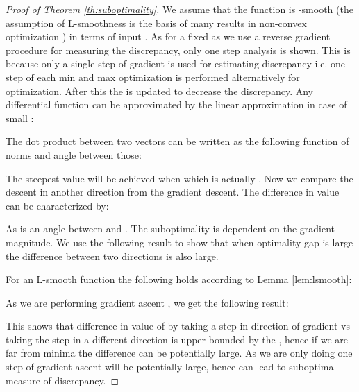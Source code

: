\documentclass[table,dvipsnames]{article}
\theoremstyle{plain}
\theoremstyle{definition}
\theoremstyle{remark}
\begin{document}
\begin{proof}[Proof of Theorem \ref{th:suboptimality}]
We assume that the function is -smooth (the assumption of L-smoothness is the basis of many results in non-convex optimization \citep{carmon2020lower}) in terms of input . As for a fixed  as we use a reverse gradient procedure for measuring the discrepancy, only one step analysis is shown. This is because only a single step of gradient is used for estimating discrepancy  i.e. one step of each min and max optimization is performed alternatively for optimization. After this the  is updated to decrease the discrepancy. Any differential function can be approximated by the linear approximation in case of small :

The dot product between two vectors can be written as the following function of norms and angle  between those:

The steepest value will be achieved when  which is actually . Now we compare the descent in another direction  from the gradient descent. The difference in value can be characterized by:

As  is an angle between  and . The suboptimality is dependent on the gradient magnitude. We use the following result to show that when optimality gap  is large the difference between two directions is also large.

For an L-smooth function  the following holds according to Lemma \ref{lem:lsmooth}:


As we are performing gradient ascent , we get the following result:



This shows that difference in value of by taking a step in direction of gradient  vs taking the step in a different direction  is upper bounded by the , hence if we are far from minima the difference can be potentially large. As we are only doing one step of gradient ascent  will be potentially large, hence can lead to suboptimal measure of discrepancy. 
\end{proof}
\end{document}
